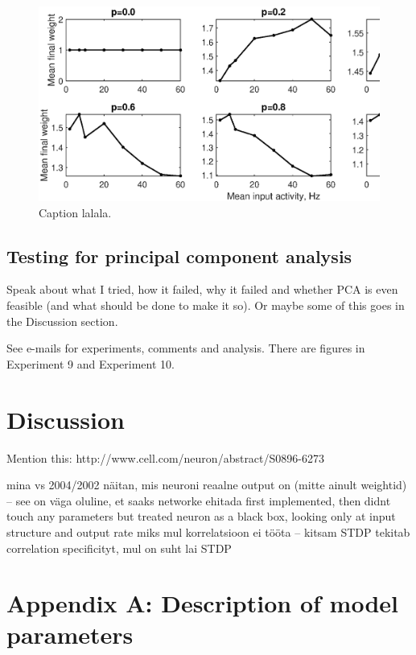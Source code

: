 \documentclass[a4paper,12pt]{report}
\theoremstyle{definition}
\begin{document}
\begin{figure}[h]
    \includegraphics[width=\textwidth]{figures/exp8_gridweights_epsp05.eps}
    \caption{Caption lalala.}
    \label{fig:exp8gridweights}
\end{figure}


\section{Testing for principal component analysis}
Speak about what I tried, how it failed, why it failed and whether PCA is even feasible (and what should be done to make it so). Or maybe some of this goes in the Discussion section.

See e-mails for experiments, comments and analysis. There are figures in Experiment 9 and Experiment 10.


\chapter{Discussion}
Mention this: http://www.cell.com/neuron/abstract/S0896-6273%

mina vs 2004/2002
näitan, mis neuroni reaalne output on (mitte ainult weightid) -- see on väga oluline, et saaks networke ehitada
first implemented, then didnt touch any parameters but treated neuron as a black box, looking only at input structure and output rate
miks mul korrelatsioon ei tööta -- kitsam STDP tekitab correlation specificityt, mul on suht lai STDP









\chapter*{Appendix A: Description of model parameters}
\label{appendix:parameters}
\end{document}
